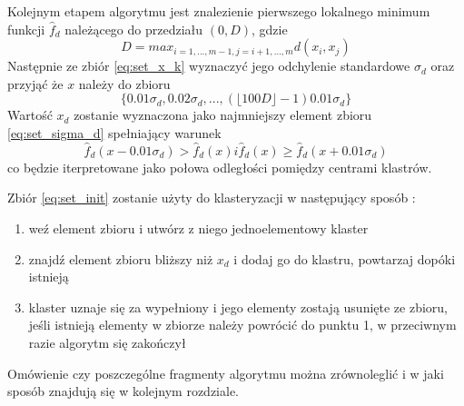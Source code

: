 Kolejnym etapem algorytmu jest znalezienie pierwszego lokalnego minimum funkcji $\hat{f}_d$ należącego do przedziału $(0, D)$, gdzie
\begin{equation}
D = max_{i=1, ..., m-1, j=i+1, ..., m } d(x_i,x_j)
\end{equation}
Następnie ze zbiór \eqref{eq:set_x_k} wyznaczyć jego odchylenie standardowe $\sigma_d$ oraz przyjąć że $x$ należy do zbioru
\begin{equation} \label{eq:set_sigma_d}
\{0.01 \sigma_d , 0.02 \sigma_d , ..., ( \lfloor 100D \rfloor -1) 0.01 \sigma_d \}
\end{equation}
Wartość $x_d$ zostanie wyznaczona jako najmniejszy element zbioru \eqref{eq:set_sigma_d} spełniający warunek
\begin{equation}
\hat{f}_d(x-0.01\sigma_d) > \hat{f}_d(x) i \hat{f}_d(x) \geq \hat{f}_d(x+0.01\sigma_d) 
\end{equation}
co będzie iterpretowane jako połowa odległości pomiędzy centrami klastrów.


Zbiór \eqref{eq:set_init} zostanie użyty do klasteryzacji w następujący sposób \cite{Kul10} :
\begin{enumerate}
\item weź element zbioru i utwórz z niego jednoelementowy klaster
\item znajdź element zbioru bliższy niż $x_d$ i dodaj go do klastru, powtarzaj dopóki istnieją
\item klaster uznaje się za wypełniony i jego elementy zostają usunięte ze zbioru, jeśli istnieją elementy w zbiorze należy powrócić do punktu 1, w przeciwnym razie algorytm się zakończył
\end{enumerate}

Omówienie czy poszczególne fragmenty algorytmu można zrównoleglić i w jaki sposób znajdują się w kolejnym rozdziale.